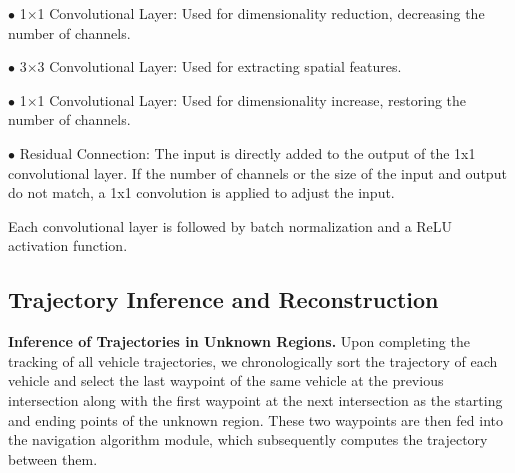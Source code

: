 $\bullet$ 1$\times$1 Convolutional Layer: Used for dimensionality reduction, decreasing the number of channels.

$\bullet$ 3$\times$3 Convolutional Layer: Used for extracting spatial features.

$\bullet$ 1$\times$1 Convolutional Layer: Used for dimensionality increase, restoring the number of channels.

$\bullet$ Residual Connection: The input is directly added to the output of the 1x1 convolutional layer. 
If the number of channels or the size of the input and output do not match, a 1x1 convolution is applied to adjust the input.

Each convolutional layer is followed by batch normalization and a ReLU activation function.

\subsection{Trajectory Inference and Reconstruction}

\textbf{Inference of Trajectories in Unknown Regions.}
Upon completing the tracking of all vehicle trajectories, we chronologically sort the trajectory of each vehicle and select the last waypoint of the same vehicle at the previous intersection along with the first waypoint at the next intersection as the starting and ending points of the unknown region. 
These two waypoints are then fed into the navigation algorithm module, which subsequently computes the trajectory between them.

